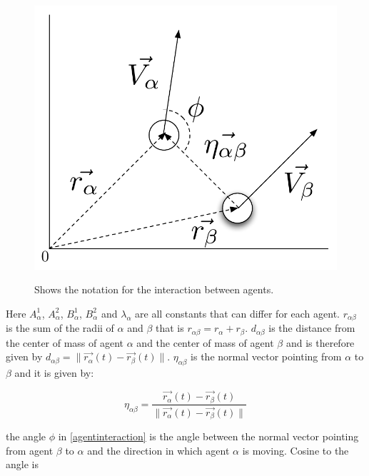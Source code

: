 \begin{figure}[ht]
    \centering
    {\includegraphics[scale=0.35]{Figures/NotationOfInteraction.pdf}} 
    \caption{Shows the notation for the interaction between agents.}
    \label{NotationOfInteraction}
\end{figure}

Here $A_{\alpha}^{1}$, $A_{\alpha}^{2}$, $B_{\alpha}^{1}$, $B_{\alpha}^{2}$ 
and $\lambda_{\alpha}$ are all constants that can differ for each agent. 
$r_{\alpha \beta}$ is the sum of the radii of $\alpha$ and $\beta$ that is 
$r_{\alpha \beta} = r_{\alpha} + r_{\beta}$. $d_{\alpha \beta}$ is the 
distance from the center of mass of agent $\alpha$ and the center of mass of 
agent $\beta$ and is therefore given by $d_{\alpha \beta} = 
\|\vec{r_{\alpha}}\left( t \right) - \vec{r_{\beta}}\left( t \right) \|$.
$\eta_{\alpha \beta}$ is the normal vector pointing from $\alpha$ to $\beta$ 
and it is given by:

\begin{equation}
    \eta_{\alpha \beta} =
        \frac{\vec{r_{\alpha}}(t) - \vec{r_{\beta}}(t)}
             {\|\vec{r_{\alpha}}(t) - \vec{r_{\beta}}(t) \|}
\end{equation}

the angle $\phi$ in \eqref{agentinteraction} is the angle between the normal 
vector pointing from agent $\beta$ to $\alpha$ and the direction in which 
agent $\alpha$ is moving. Cosine to the angle is 

